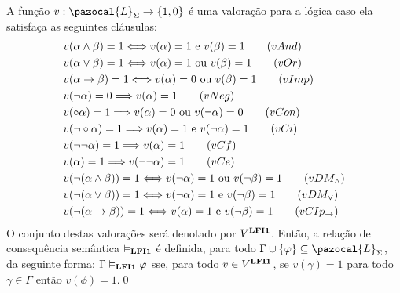         \begin{definicao} 
            \label{def:valoracoes}
            A função $v : \pazocal{L}_{\Sigma} \rightarrow \{1, 0\}$ é uma valoração para a lógica \lfium{} caso ela satisfaça as seguintes cláusulas:
            \begin{align*}
                & v(\alpha \land \beta) = 1 \Longleftrightarrow v(\alpha) = 1 \text{ e } v(\beta) = 1\tag{\textbf{$vAnd$}}\\
                & v(\alpha \lor \beta) = 1 \Longleftrightarrow v(\alpha) = 1 \text{ ou } v(\beta) = 1\tag{\textbf{$vOr$}}\\
                & v(\alpha \rightarrow \beta) = 1 \Longleftrightarrow v(\alpha) = 0 \text{ ou } v(\beta) = 1\tag{\textbf{$vImp$}}\\
                & v(\neg \alpha) = 0 \Longrightarrow v(\alpha) = 1\tag{\textbf{$vNeg$}}\\
                & v(\circ \alpha) = 1 \Longrightarrow v(\alpha) = 0 \text{ ou } v(\neg \alpha) = 0\tag{\textbf{$vCon$}}\\
                & v(\neg \circ \alpha) = 1 \Longrightarrow v(\alpha) = 1 \text{ e } v(\neg \alpha) = 1\tag{\textbf{$vCi$}}\\
                & v(\neg \neg \alpha) = 1 \Longrightarrow v(\alpha) = 1\tag{\textbf{$vCf$}}\\
                & v(\alpha) = 1 \Longrightarrow v(\neg \neg \alpha) = 1\tag{\textbf{$vCe$}}\\
                & v(\neg (\alpha \land \beta)) = 1 \Longleftrightarrow v(\neg \alpha) = 1 \text{ ou } v(\neg \beta) = 1\tag{\textbf{$vDM_{\land}$}}\\
                & v(\neg (\alpha \lor \beta)) = 1 \Longleftrightarrow v(\neg \alpha) = 1 \text{ e } v(\neg \beta) = 1\tag{\textbf{$vDM_{\lor}$}}\\
                & v(\neg (\alpha \rightarrow \beta)) = 1 \Longleftrightarrow v(\alpha) = 1 \text{ e } v(\neg \beta) = 1\tag{\textbf{$vCIp_{\rightarrow}$}}
            \end{align*}
            O conjunto destas valorações será denotado por $V^{\textbf{LFI1}{}}$. Então, a relação de consequência semântica $\vDash_{\textbf{LFI1}{}}$ é definida, para todo $\Gamma \cup \{\phi\} \subseteq \pazocal{L}_{\Sigma}$, da seguinte forma: $\Gamma \vDash_{\textbf{LFI1}{}} \varphi$ sse, para todo $v \in V^{\textbf{LFI1}{}}$, se $v(\gamma) = 1$ para todo $\gamma \in \Gamma$ então $v(\phi) = 1$.\qed{}
        \end{definicao}

